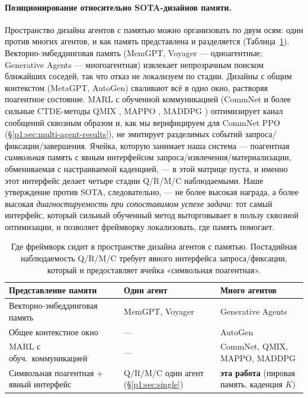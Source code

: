 \documentclass{article}
\begin{document}
\paragraph{Позиционирование относительно SOTA-дизайнов памяти.}
Пространство дизайна агентов с памятью можно организовать по двум осям: один против многих агентов, и как память представлена и разделяется (Таблица~\ref{p1:tab:sota-quadrants}). Векторно-эмбеддинговая память (MemGPT, Voyager --- одноагентные; Generative Agents --- многоагентная) извлекает непрозрачным поиском ближайших соседей, так что отказ не локализуем по стадии. Дизайны с общим контекстом (MetaGPT, AutoGen) сваливают всё в одно окно, растворяя поагентное состояние. MARL с обученной коммуникацией (CommNet и более сильные CTDE-методы QMIX \citep{rashid2018qmix}, MAPPO \citep{yu2022mappo}, MADDPG \citep{lowe2017maddpg}) оптимизирует канал сообщений сквозным образом и, как мы верифицируем для CommNet PPO (\S\ref{p1:sec:multi-agent-results}), не эмитирует разделимых событий запроса/фиксации/завершения. Ячейка, которую занимает наша система --- поагентная \emph{символьная} память с явным интерфейсом запроса/извлечения/материализации, обмениваемая с настраиваемой каденцией, --- в этой матрице пуста, и именно этот интерфейс делает четыре стадии Q/R/M/C наблюдаемыми. Наше утверждение против SOTA, следовательно, --- не более высокая награда, а более высокая \emph{диагностируемость при сопоставимом успехе задачи}: тот самый интерфейс, который сильный обученный метод выторговывает в пользу сквозной оптимизации, и позволяет фреймворку локализовать, где память помогает.

\begin{table}[h]
\caption{Где фреймворк сидит в пространстве дизайна агентов с памятью. Постадийная наблюдаемость Q/R/M/C требует явного интерфейса запроса/фиксации, который и предоставляет ячейка «символьная поагентная».}
\label{p1:tab:sota-quadrants}
\centering
\small
\begin{tabular}{p{3.1cm} p{4.3cm} p{4.3cm}}
\toprule
Представление памяти & Один агент & Много агентов \\
\midrule
Векторно-эмбеддинговая память & MemGPT, Voyager \citep{packer2023memgpt,wang2023voyager} & Generative Agents \citep{park2023generative} \\
Общее контекстное окно & --- & AutoGen \citep{wu2023autogen} \\
MARL с обуч.\ коммуникацией & --- & CommNet, QMIX, MAPPO, MADDPG \citep{sukhbaatar2016commnet,rashid2018qmix,yu2022mappo,lowe2017maddpg} \\
Символьная поагентная + явный интерфейс & Q/R/M/C один агент (\S\ref{p1:sec:single}) & \textbf{эта работа} (пировая память, каденция $K$) \\
\bottomrule
\end{tabular}
\end{table}
\end{document}
